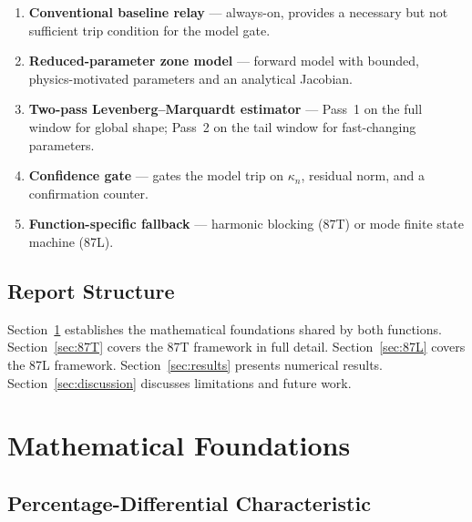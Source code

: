\documentclass[12pt,a4paper]{article}
\newcommand{\kappan}{\kappa_n}
\begin{document}
\begin{enumerate}
  \item \textbf{Conventional baseline relay} --- always-on, provides a
        necessary but not sufficient trip condition for the model gate.
  \item \textbf{Reduced-parameter zone model} --- forward model with bounded,
        physics-motivated parameters and an analytical Jacobian.
  \item \textbf{Two-pass Levenberg--Marquardt estimator} --- Pass~1 on the
        full window for global shape; Pass~2 on the tail window for
        fast-changing parameters.
  \item \textbf{Confidence gate} --- gates the model trip on $\kappan$,
        residual norm, and a confirmation counter.
  \item \textbf{Function-specific fallback} --- harmonic blocking (87T)
        or mode finite state machine (87L).
\end{enumerate}

\subsection{Report Structure}

Section~\ref{sec:math_foundations} establishes the mathematical foundations
shared by both functions.  Section~\ref{sec:87T} covers the 87T framework
in full detail.  Section~\ref{sec:87L} covers the 87L framework.
Section~\ref{sec:results} presents numerical results.
Section~\ref{sec:discussion} discusses limitations and future work.

\section{Mathematical Foundations}
\label{sec:math_foundations}

\subsection{Percentage-Differential Characteristic}
\label{sec:pct_diff}
\end{document}
